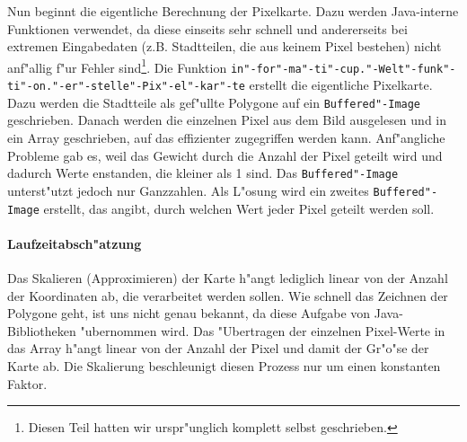 Nun beginnt die eigentliche Berechnung der Pixelkarte. Dazu werden Java-interne Funktionen verwendet, da diese einseits sehr schnell und andererseits bei extremen Eingabedaten (z.B. Stadtteilen, die aus keinem Pixel bestehen) nicht anf"allig f"ur Fehler sind\footnote{Diesen Teil hatten wir urspr"unglich komplett selbst geschrieben.}. Die Funktion \texttt{in"-for"-ma"-ti"-cup."-Welt"-funk"-ti"-on."-er"-stelle"-Pix"-el"-kar"-te} erstellt die eigentliche Pixelkarte. Dazu werden die Stadtteile als gef"ullte Polygone auf ein \texttt{Buffered"-Image} geschrieben. Danach werden die einzelnen Pixel aus dem Bild ausgelesen und in ein Array geschrieben, auf das effizienter zugegriffen werden kann. Anf"angliche Probleme gab es, weil das Gewicht durch die Anzahl der Pixel geteilt wird und dadurch Werte enstanden, die kleiner als 1 sind. Das \texttt{Buffered"-Image} unterst"utzt jedoch nur Ganzzahlen. Als L"osung wird ein zweites \texttt{Buffered"-Image} erstellt, das angibt, durch welchen Wert jeder Pixel geteilt werden soll.

\paragraph{Laufzeitabsch"atzung}
Das Skalieren (Approximieren) der Karte h"angt lediglich linear von der Anzahl der Koordinaten ab, die verarbeitet werden sollen. Wie schnell das Zeichnen der Polygone geht, ist uns nicht genau bekannt, da diese Aufgabe von Java-Bibliotheken "ubernommen wird. Das "Ubertragen der einzelnen Pixel-Werte in das Array h"angt linear von der Anzahl der Pixel und damit der Gr"o"se der Karte ab. Die Skalierung beschleunigt diesen Prozess nur um einen konstanten Faktor. 